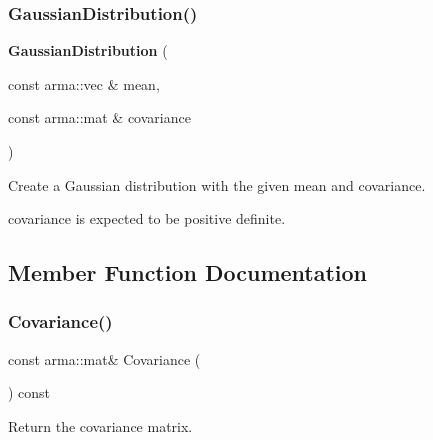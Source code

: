 \mbox{\label{classmlpack_1_1distribution_1_1GaussianDistribution_af7cc39bc7a94d9714077d9806bc5bd8c}} 
\subsubsection{Gaussian\+Distribution()\hspace{0.1cm}{\footnotesize\ttfamily [3/3]}}
{\footnotesize\ttfamily \textbf{ Gaussian\+Distribution} (\begin{DoxyParamCaption}\item[{const arma\+::vec \&}]{mean,  }\item[{const arma\+::mat \&}]{covariance }\end{DoxyParamCaption})}



Create a Gaussian distribution with the given mean and covariance. 

covariance is expected to be positive definite. 

\subsection{Member Function Documentation}
\mbox{\label{classmlpack_1_1distribution_1_1GaussianDistribution_a7cab8a0b8c0deac1833f3e489fa52daf}} 
\subsubsection{Covariance()\hspace{0.1cm}{\footnotesize\ttfamily [1/3]}}
{\footnotesize\ttfamily const arma\+::mat\& Covariance (\begin{DoxyParamCaption}{ }\end{DoxyParamCaption}) const\hspace{0.3cm}{\ttfamily [inline]}}



Return the covariance matrix. 



